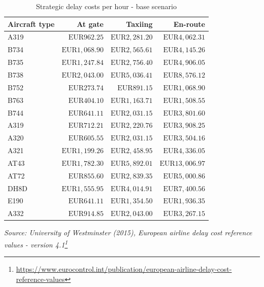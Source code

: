 \documentclass[
  11pt,
  a4paper,
]{book}
\DeclareRobustCommand{\href}[2]{#2\footnote{\url{#1}}}
\begin{document}
\hypertarget{tbl-delay-cost-hour}{}
\setlength{\LTpost}{0mm}
\begin{longtable}{lrrr}
\caption{\label{tbl-delay-cost-hour}Strategic delay costs per hour - base scenario }\tabularnewline

\toprule
Aircraft type & At gate & Taxiing & En-route \\ 
\midrule
A319 & $\text{EUR}962.25$ & $\text{EUR}2,281.20$ & $\text{EUR}4,062.31$ \\ 
B734 & $\text{EUR}1,068.90$ & $\text{EUR}2,565.61$ & $\text{EUR}4,145.26$ \\ 
B735 & $\text{EUR}1,247.84$ & $\text{EUR}2,756.40$ & $\text{EUR}4,906.05$ \\ 
B738 & $\text{EUR}2,043.00$ & $\text{EUR}5,036.41$ & $\text{EUR}8,576.12$ \\ 
B752 & $\text{EUR}273.74$ & $\text{EUR}891.15$ & $\text{EUR}1,068.90$ \\ 
B763 & $\text{EUR}404.10$ & $\text{EUR}1,163.71$ & $\text{EUR}1,508.55$ \\ 
B744 & $\text{EUR}641.11$ & $\text{EUR}2,031.15$ & $\text{EUR}3,801.60$ \\ 
A319 & $\text{EUR}712.21$ & $\text{EUR}2,220.76$ & $\text{EUR}3,908.25$ \\ 
A320 & $\text{EUR}605.55$ & $\text{EUR}2,031.15$ & $\text{EUR}3,504.16$ \\ 
A321 & $\text{EUR}1,199.26$ & $\text{EUR}2,458.95$ & $\text{EUR}4,336.05$ \\ 
AT43 & $\text{EUR}1,782.30$ & $\text{EUR}5,892.01$ & $\text{EUR}13,006.97$ \\ 
AT72 & $\text{EUR}855.60$ & $\text{EUR}2,839.35$ & $\text{EUR}5,000.86$ \\ 
DH8D & $\text{EUR}1,555.95$ & $\text{EUR}4,014.91$ & $\text{EUR}7,400.56$ \\ 
E190 & $\text{EUR}641.11$ & $\text{EUR}1,354.50$ & $\text{EUR}1,936.35$ \\ 
A332 & $\text{EUR}914.85$ & $\text{EUR}2,043.00$ & $\text{EUR}3,267.15$ \\ 
\bottomrule
\end{longtable}
\begin{minipage}{\linewidth}
\emph{Source: \href{https://www.eurocontrol.int/publication/european-airline-delay-cost-reference-values}{University of Westminster (2015), European airline delay cost reference values - version 4.1}}\\
\end{minipage}
\end{document}
